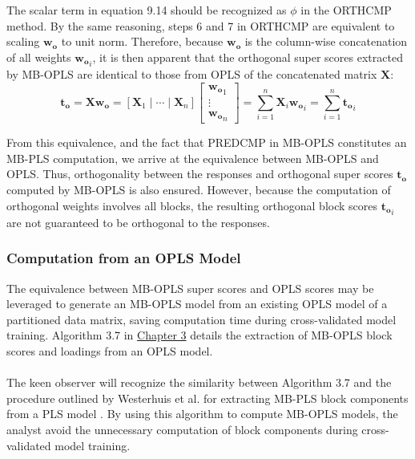 \begin{doublespace}
The scalar term in equation 9.14 should be recognized as $\phi$ in the
ORTHCMP method. By the same reasoning, steps 6 and 7 in ORTHCMP are
equivalent to scaling $\mathbf{w_o}$ to unit norm. Therefore, because
$\mathbf{w_o}$ is the column-wise concatenation of all weights
$\mathbf{w_o}_i$, it is then apparent that the orthogonal super scores
extracted by MB-OPLS are identical to those from OPLS of the concatenated
matrix $\mathbf{X}$:
\begin{equation}
\mathbf{t_o} = \mathbf{X} \mathbf{w_o} =
 [\mathbf{X}_1 \mid\cdots\mid \mathbf{X}_n]
 \begin{bmatrix}
  \mathbf{w_o}_1 \\
  \vdots \\
  \mathbf{w_o}_n
 \end{bmatrix}
 = \sum_{i=1}^n \mathbf{X}_i \mathbf{w_o}_i
 = \sum_{i=1}^n \mathbf{t_o}_i
\end{equation}

From this equivalence, and the fact that PREDCMP in MB-OPLS constitutes an
MB-PLS computation, we arrive at the equivalence between MB-OPLS and OPLS.
Thus, orthogonality between the responses and orthogonal super scores
$\mathbf{t_o}$ computed by MB-OPLS is also ensured. However, because the
computation of orthogonal weights involves all blocks, the resulting
orthogonal block scores $\mathbf{t_o}_i$ are not guaranteed to be orthogonal
to the responses.
\end{doublespace}

\subsubsection{Computation from an OPLS Model}

\begin{doublespace}
The equivalence between MB-OPLS super scores and OPLS scores may be leveraged
to generate an MB-OPLS model from an existing OPLS model of a partitioned
data matrix, saving computation time during cross-validated model training.
Algorithm 3.7 in \hyperlink{subsection.3.5.6}{Chapter 3} details the
extraction of MB-OPLS block scores and loadings from an OPLS model.
\\\\
The keen observer will recognize the similarity between Algorithm 3.7 and the
procedure outlined by Westerhuis et al. for extracting MB-PLS block components
from a PLS model \cite{westerhuis:jchemo1998}. By using this algorithm to
compute MB-OPLS models, the analyst avoid the unnecessary computation of
block components during cross-validated model training.
\end{doublespace}

